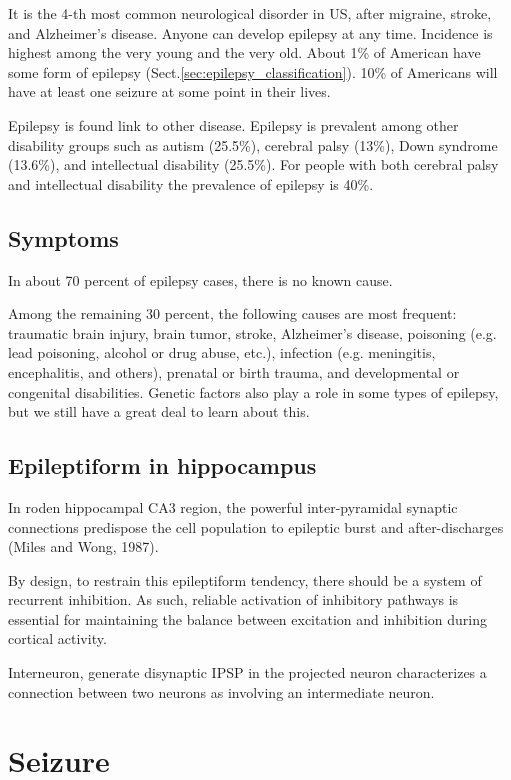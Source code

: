 It is the 4-th most common neurological disorder in US, after migraine, stroke,
and Alzheimer's disease. Anyone can develop epilepsy at any time. Incidence is
highest among the very young and the very old. About 1\% of American have some
form of epilepsy (Sect.\ref{sec:epilepsy_classification}).  10\% of Americans
will have at least one seizure at some point in their lives.
 
Epilepsy is found link to other disease. Epilepsy is prevalent among other
disability groups such as autism (25.5\%), cerebral palsy (13\%), Down syndrome
(13.6\%), and intellectual disability (25.5\%). For people with both cerebral
palsy and intellectual disability the prevalence of epilepsy is 40\%.

\subsection{Symptoms}

In about 70 percent of epilepsy cases, there is no known cause.

Among the remaining 30 percent, the following causes are most frequent:
traumatic brain injury, brain tumor, stroke, Alzheimer's disease, poisoning
(e.g. lead poisoning, alcohol or drug abuse, etc.), infection (e.g. meningitis,
encephalitis, and others), prenatal or birth trauma, and developmental or
congenital disabilities. Genetic factors also play a role in some types of
epilepsy, but we still have a great deal to learn about this.
 



\subsection{Epileptiform in hippocampus}

In roden hippocampal CA3 region, the powerful inter-pyramidal synaptic
connections predispose the cell population to epileptic burst and
after-discharges (Miles and Wong, 1987).

By design, to restrain this epileptiform tendency, there should be a system of
recurrent inhibition. As such, reliable activation of inhibitory pathways is
essential for maintaining the balance between excitation and inhibition during
cortical activity.


Interneuron, generate disynaptic IPSP in the projected neuron characterizes a
connection between two neurons as involving an intermediate neuron.
 

\section{Seizure}
\label{sec:seizure}

